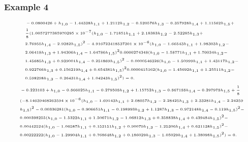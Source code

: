 \documentclass{beamer}
\begin{document}
\begin{frame}\frametitle{Example 4}
	\justifying
\begin{equation}\label{14a}
\tiny
\begin{aligned}
&-0.0800426+h_{1,0}-1.44338 h_{1,1}+1.2112 h_{1,2}-0.520576 h_{1,3}-0.357928 h_{1,4}+1.11562 h_{1,5}+\\
&\frac{1}{8}(1.0057277385970295\times10^{-7}( h_{1,0}-1.71851 h_{1,1}+2.18383 h_{1,2}-2.52285 h_{1,3}+\\
&2.76955 h_{1,4}-2.9382 h_{1,5})^{2}-4.916723418537301\times10^{-6}( h_{1,0}-1.66543 h_{1,1}+1.98303 h_{1,2}-\\
&2.06418 h_{1,3}+1.94306 h_{1,4}-1.64786 h_{1,5})^{2}0.0000274348(h_{1,0}-1.58771 h_{1,1}+1.70034 h_{1,2}-\\
&1.45685 h_{1,3}+0.939001 h_{1,4}-0.251869 h_{1,5})^{2}-0.0000546326(h_{1,0}-1.50999 h_{1,1}+1.43117 h_{1,2}-\\
&0.922766 h_{1,3}+0.156219 h_{1,4}+0.654381 h_{1,5})^{2}0.0000415162(h_{1,0}-1.45692 h_{1,1}+1.25511 h_{1,2}-\\
&0.598298 h_{1,3}-0.26431 h_{1,4}+1.04243 h_{1,5})^{2})=0.
\end{aligned}
\end{equation}
\begin{equation}\label{14b}
\tiny
\begin{aligned}
&-0.223103+h_{1,0}-0.866025 h_{1,1}-0.279508 h_{1,2}+1.15752 h_{1,3}-0.867188 h_{1,4}-0.297978 h_{1,5}+\frac{1}{8}\\
&(-8.14639468263594\times10^{-6}( h_{1,0}-1.69143 h_{1,1}+2.08057 h_{1,2}-2.28425 h_{1,3}+2.33281 h_{1,4}-2.24259\\
&h_{1,5})^{2}-0.00336281(h_{1,0}-0.906651 h_{1,1}-0.198993 h_{1,2}+1.1287 h_{1,3}-0.972148 h_{1,4}-0.119 h_{1,5})^{2}-\\
&0.000398255(h_{1,0}-1.5322 h_{1,1}+1.50671 h_{1,2}-1.06812 h_{1,3}+0.358838 h_{1,4}+0.439484 h_{1,5})^{2}-\\
&0.00442524(h_{1,0}-1.06587 h_{1,1}+0.152151 h_{1,2}+0.90079 h_{1,3}-1.25306 h_{1,4}+0.631138 h_{1,5})^{2}-\\
&0.00222222(h_{1,0}-1.29904 h_{1,1}+0.768648 h_{1,2}+0.186029 h_{1,3}-1.05029 h_{1,4}+1.38098 h_{1,5})^{2})=0.\\
\end{aligned}
\end{equation}		
\end{frame}
\end{document}
